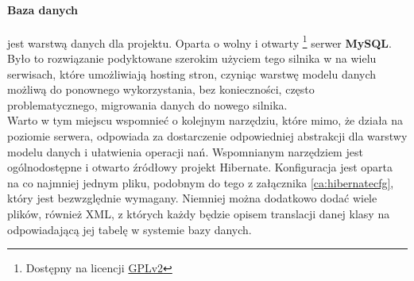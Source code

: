 		\paragraph{Baza danych} jest warstwą danych dla projektu. Oparta o wolny i otwarty \footnote{
			Dostępny na licencji \href{http://www.gnu.org/licenses/old-licenses/gpl-2.0.html}{GPLv2}
		}
			serwer \textbf{MySQL}. Było to rozwiązanie podyktowane szerokim użyciem tego silnika w 
			na wielu serwisach, które umożliwiają hosting stron, czyniąc warstwę modelu danych możliwą
			do ponownego wykorzystania, bez konieczności, często problematycznego, migrowania danych do
			nowego silnika. \\
			Warto w tym miejscu wspomnieć o kolejnym narzędziu, które mimo, że działa na poziomie serwera, 
			odpowiada za dostarczenie odpowiedniej abstrakcji dla warstwy modelu danych i ułatwienia
			operacji nań. Wspomnianym narzędziem jest ogólnodostępne i otwarto źródłowy projekt Hibernate. 
			Konfiguracja jest oparta na co najmniej jednym pliku, podobnym do tego z załącznika \ref{ca:hibernatecfg},
			który jest bezwzględnie wymagany. Niemniej można dodatkowo dodać wiele plików, również XML, z których
			każdy będzie opisem translacji danej klasy na odpowiadającą jej tabelę w systemie bazy danych. 
